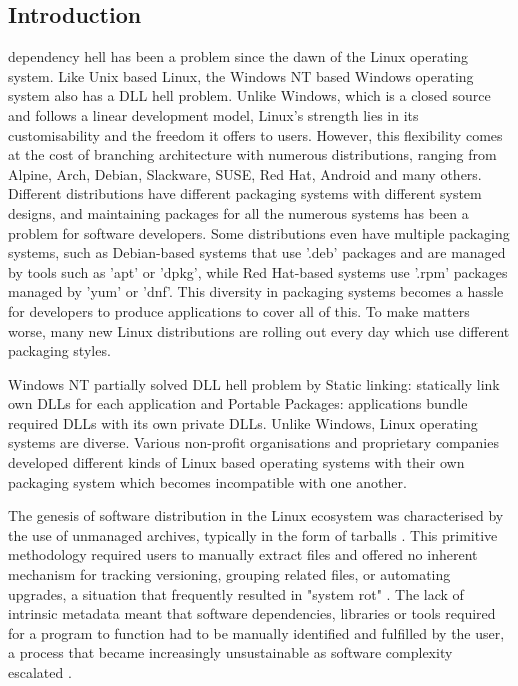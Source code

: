 \documentclass[journal,onecolumn]{IEEEtran}
\begin{document}
\subsection{Introduction}
 dependency hell has been a problem since the dawn of the Linux operating system. Like Unix based Linux, the Windows NT based Windows operating system also has a DLL hell problem. Unlike Windows, which is a closed source and follows a linear development model, Linux's strength lies in its customisability and the freedom it offers to users. However, this flexibility comes at the cost of branching architecture with numerous distributions, ranging from Alpine, Arch, Debian, Slackware, SUSE, Red Hat, Android and many others. Different distributions have different packaging systems with different system designs, and maintaining packages for all the numerous systems has been a problem for software developers. Some distributions even have multiple packaging systems, such as Debian-based systems that use '.deb' packages and are managed by tools such as 'apt' or 'dpkg', while Red Hat-based systems use '.rpm' packages managed by 'yum' or 'dnf'. This diversity in packaging systems becomes a hassle for developers to produce applications to cover all of this. To make matters worse, many new Linux distributions are rolling out every day which use different packaging styles. 

Windows NT partially solved DLL hell problem by Static linking: statically link own DLLs for each application and Portable Packages: applications bundle required DLLs with its own private DLLs. Unlike Windows, Linux operating systems are diverse. Various non-profit organisations and proprietary companies developed different kinds of Linux based operating systems with their own packaging system which becomes incompatible with one another. 

The genesis of software distribution in the Linux ecosystem was characterised by the use of unmanaged archives, typically in the form of tarballs \cite{Varun2019}. This primitive methodology required users to manually extract files and offered no inherent mechanism for tracking versioning, grouping related files, or automating upgrades, a situation that frequently resulted in "system rot" \cite{Varun2019}. The lack of intrinsic metadata meant that software dependencies, libraries or tools required for a program to function had to be manually identified and fulfilled by the user, a process that became increasingly unsustainable as software complexity escalated \cite{Varun2019}.
\end{document}
